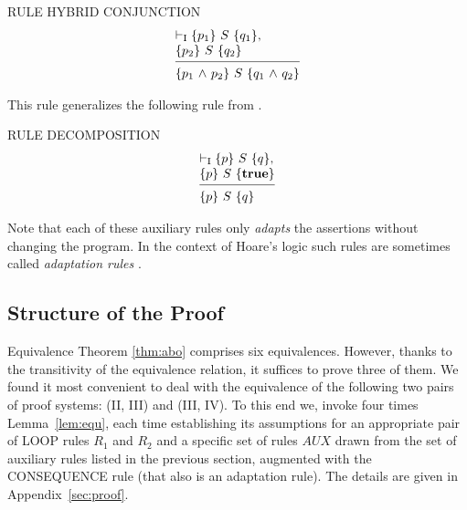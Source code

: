 \documentclass[manuscript, screen, review]{acmart}
\newcommand{\AUX}{\mathit{AUX}}
\begin{document}
\III

\noindent
RULE HYBRID CONJUNCTION
\[
 \begin{array}{l}
  \vdash_{\rm{I}} \HT{p_1}{S}{q_1},   \\
  \HT{p_2}{S}{q_2}                    \\
  [-\medskipamount]
  \hrulefill                          \\
  \HT{p_1 \A p_2}{S}{q_1 \A q_2}
 \end{array}
\]

This rule generalizes the following rule from \cite{ABO09}.
\III

\noindent
RULE DECOMPOSITION
\[
 \begin{array}{l}
  \vdash_{\rm{I}} \HT{p}{S}{q},      \\
  \HT{p}{S}{\T}                      \\
  [-\medskipamount]
  \hrulefill                         \\
  \HT{p}{S}{q}
  \end{array}
\]

\III




Note that each of these auxiliary rules only \emph{adapts} the assertions without changing the program.
In the context of Hoare's logic such rules are sometimes called \emph{adaptation rules}
\cite{Hoa71,Old83,GR16}.



\subsection{Structure of the Proof}
\label{subsec:structure}

Equivalence Theorem \ref{thm:abo} comprises six equivalences. However,
thanks to the transitivity of the equivalence relation, it suffices to
prove three of them. We found it most convenient to deal with the
equivalence of the following two pairs of proof systems: (II, III) and
(III, IV). To this end we, invoke four times
Lemma~\ref{lem:equ}, each time establishing its assumptions for an
appropriate pair of LOOP rules $R_1$ and $R_2$ and a specific set of
rules $\AUX$ drawn from the set of auxiliary rules listed in the
previous section, augmented with the CONSEQUENCE rule (that also is an
adaptation rule).  The details are given in Appendix~\ref{sec:proof}.
\end{document}
